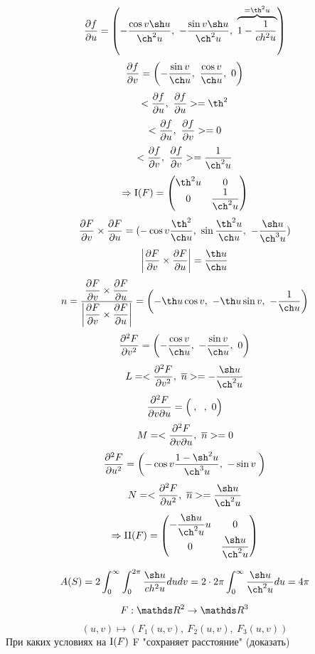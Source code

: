 \documentclass[12pt, fleqn]{article}
\begin{document}
\begin{sol}
  \[\dfrac{\d f}{\d u} = \Br{-\dfrac{\cos v \sh u}{\ch^2 u},\ -\dfrac{\sin v \sh u}{\ch^2 u},\ \ob{= \th^2 u}{1 - \dfrac{1}{ch^2 u}}}\]
  \[\dfrac{\d f}{\d v} = \Br{-\dfrac{\sin v}{\ch u},\ \dfrac{\cos v}{\ch u},\ 0}\]
  \[<\dfrac{\d f}{\d u},\ \dfrac{\d f}{\d u}> = \th^2\]
  \[<\dfrac{\partial f}{\partial u},\ \dfrac{\partial f}{\partial v}> = 0\]
  \[<\dfrac{\d f}{\d v},\ \dfrac{\d f}{\d v}> = \dfrac{1}{\ch^2 u}\]
  \[\Ra \RNumb{1}(F) = \begin{pmatrix}
    {}\th^2 u & 0\\
    0 & \dfrac{1}{\ch^2 u}
  \end{pmatrix}\]
  \[\frac{\d F}{\d v} \times \frac{\d F}{\d u} =
  (
    -\cos v \dfrac{\th^2}{\ch u},\
    \sin \dfrac{\th^2 u}{\ch u},\
    -\dfrac{\sh u}{\ch^3 u}
  )\]
  \[\abs{\dfrac{\d F}{\d v} \times \dfrac{\d F}{\d u}} = \dfrac{\th u}{\ch u}\]
  \[n =
  \dfrac{
    \dfrac{\d F}{\d v} \times \dfrac{\d F}{\d u}
  }{
    \abs{\dfrac{\d F}{\d v} \times \dfrac{\d F}{\d u}}
  } = \Br{- \th u \cos v,\ -\th u \sin v,\ -\dfrac{1}{\ch u}}\]
  \[\frac{\d^2 F}{\d v^2} = \Br{-\dfrac{\cos v}{\ch u},\ -\dfrac{\sin v}{\ch u},\ 0}\]
  \[L = <\frac{\d^2 F}{\d v^2},\ \ol{n}> = -\dfrac{\sh u}{\ch^2 u}\]
  \[\frac{\partial^2 F}{\partial v \partial u} = \left(\dfrac{}{},\ \dfrac{}{},\ 0\right)\]
  \[M = <\frac{\partial^2 F}{\partial v \partial u},\ \overline{n}> = 0\]
  \[\frac{\d^2 F}{\d u^2} = \Br{-\cos v \dfrac{1-\sh^2 u}{\ch^3 u},\ -\sin v \dfrac{}{}}\]
  \[N = <\frac{\d^2 F}{\d u^2},\ \ol{n}> = \dfrac{\sh u}{\ch^2 u}\]
  \[\Ra \RNumb{2}(F) = \begin{pmatrix}
    -\dfrac{\sh u}{\ch^2 u} u & 0\\
    0 & \dfrac{\sh u}{\ch^2 u}
  \end{pmatrix}\]

  \begin{figure}[H]
      \centering
  \end{figure}

  \[A(S) = 2 \int_0^{\infty} \int_0^{2\pi} \dfrac{\sh u}{ch^2 u} du dv = 2 \cdot 2\pi \int_0^{\infty} \dfrac{\sh u}{\ch^2 u} du = 4\pi\]
\end{sol}

\begin{Example}
  \[F: \R^2 \ra \R^3\]
  \[(u,v) \mapsto (F_1(u,v),\ F_2(u,v),\ F_3 (u,v))\]
  При каких условиях на $\RNumb{1}(F)$ F "сохраняет расстояние" (доказать)
\end{Example}
\end{document}
